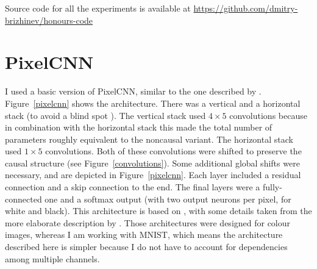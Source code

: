 \documentclass[11pt, a4paper, openany]{book}
\begin{document}
Source code for all the experiments is available at \url{https://github.com/dmitry-brizhinev/honours-code}

\section{PixelCNN}

I used a basic version of PixelCNN, similar to the one described by \citet{pixelcnn2}. Figure~\ref{pixelcnn} shows the architecture. There was a vertical and a horizontal stack (to avoid a blind spot \citep{pixelcnn2}). The vertical stack used $4\times 5$ convolutions because in combination with the horizontal stack this made the total number of parameters roughly equivalent to the noncausal variant. The horizontal stack used $1\times 5$ convolutions. Both of these convolutions were shifted to preserve the causal structure (see Figure~\ref{convolutions}). Some additional global shifts were necessary, and are depicted in Figure~\ref{pixelcnn}. Each layer included a residual connection and a skip connection to the end. The final layers were a fully-connected one and a softmax output (with two output neurons per pixel, for white and black). This architecture is based on \citet{pixelcnn2}, with some details taken from the more elaborate description by \citet{pixelcnn3}. Those architectures were designed for colour images, whereas I am working with MNIST, which means the architecture described here is simpler because I do not have to account for dependencies among multiple channels.
\end{document}
